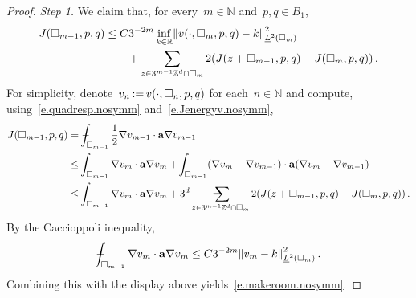 \documentclass[11pt,twoside]{article} %
\makeatletter
\let\oldsquare\square %
\renewcommand{\square}{\oldsquare}
\numberwithin{equation}{section}
\theoremstyle{definition}
\let\originalleft\left
\let\originalright\right
\renewcommand{\left}{\mathopen{}\mathclose\bgroup\originalleft}
\renewcommand{\right}{\aftergroup\egroup\originalright}
\newcommand*{\N}{\ensuremath{\mathbb{N}}}
\newcommand*{\R}{\ensuremath{\mathbb{R}}}
\newcommand*{\Zd}{\ensuremath{\mathbb{Z}^d}}
\renewcommand{\a}{\mathbf{a}}
\newcommand{\cu}{\square}
\newcommand{\avsum}{\mathop{\mathpalette\avsuminner\relax}\displaylimits}
\newcommand\avsuminner[2]{%
  {\sbox0{$\m@th#1\sum$}%
   \vphantom{\usebox0}%
   \ooalign{%
     \hidewidth
     \smash{\,\rule[.23em]{8.8pt}{1.1pt} \relax}%
     \hidewidth\cr
   ~$\m@th#1\sum$\cr
   }%
  }%
}
\def\Xint#1{\mathchoice
{\XXint\displaystyle\textstyle{#1}}%
{\XXint\textstyle\scriptstyle{#1}}%
{\XXint\scriptstyle\scriptscriptstyle{#1}}%
{\XXint\scriptscriptstyle\scriptscriptstyle{#1}}%
\!\int}
\def\XXint#1#2#3{{\setbox0=\hbox{$#1{#2#3}{\int}$}
\vcenter{\hbox{$#2#3$}}\kern-.5\wd0}}
\def\fint{\Xint-}
\makeatother
\begin{document}
\begin{proof}
\emph{Step 1.} We claim that, for every~$m\in\N$ and~$p,q\in B_1$, 
\begin{align}
\label{e.makeroom.nosymm}
J(\cu_{m-1},p,q) 
&
\leq 
C
3^{-2m}
\inf_{k\in\R}
\left\| v(\cdot,\cu_m,p,q) - k \right\|_{\underline{L}^2(\cu_m)}^2
\notag \\ & \qquad 
+
\sum_{z\in 3^{m-1}\Zd\cap \cu_m} 
2( J(z+\cu_{m-1},p,q) - J (\cu_m,p,q) )
\,.
\end{align}
For simplicity, denote~$v_n \hspace{-1pt}  :=  \hspace{-1pt}  v(\cdot,\cu_n,p,q)$ for each~$n\in\N$ and compute, using~\eqref{e.quadresp.nosymm} and~\eqref{e.Jenergyv.nosymm}, 
\begin{align*}
J(\cu_{m-1},p,q) 
& 
=
\fint_{\cu_{m-1}} 
\frac12
\nabla v_{m-1} 
\cdot \a\nabla v_{m-1}
\\ & 
\leq 
\fint_{\cu_{m-1}} 
\nabla v_{m} 
\cdot \a\nabla v_{m}
+
\fint_{\cu_{m-1}} 
\left( \nabla v_{m}
-
\nabla v_{m-1} \right) 
\cdot 
\a\left( \nabla v_{m}
-
\nabla v_{m-1}
\right) 
\\ & 
\leq
\fint_{\cu_{m-1}} 
\nabla v_{m} 
\cdot \a\nabla v_{m}
+
3^d 
\avsum_{z\in 3^{m-1}\Zd\cap \cu_m} 
2( J(z+\cu_{m-1},p,q) - J (\cu_m,p,q) )
\,.
\end{align*}
By the Caccioppoli inequality,
\begin{equation*}
\fint_{\cu_{m-1}}
\nabla v_m \cdot\a\nabla v_m
\leq
C
3^{-2m}
\left\| v_m -k \right\|_{\underline{L}^2(\cu_m)}^2
\,.
\end{equation*}
Combining this with the display above yields~\eqref{e.makeroom.nosymm}. 

\smallskip


\end{proof}
\end{document}
